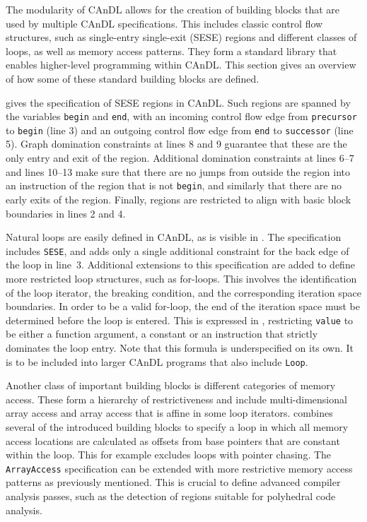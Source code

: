     The modularity of CAnDL allows for the creation of building blocks that are
    used by multiple CAnDL specifications.
    This includes classic control flow structures, such as single-entry
    single-exit (SESE) regions and different classes of loops, as well as memory
    access patterns.
    They form a standard library that enables higher-level programming
    within CAnDL.
    This section gives an overview of how some of these standard building
    blocks are defined.

     gives the specification of SESE regions in CAnDL.
    Such regions are spanned by the variables {\tt begin} and {\tt end}, with an
    incoming control flow edge from {\tt precursor} to {\tt begin} (line 3) and
    an outgoing control flow edge from {\tt end} to {\tt successor} (line 5).
    Graph domination constraints at lines 8 and 9 guarantee that these are the
    only entry and exit of the region.
    Additional domination constraints at lines 6--7 and lines 10--13 make sure
    that there are no jumps from outside the region into an instruction of the
    region that is not {\tt begin}, and similarly that there are no early exits
    of the region.
    Finally, regions are restricted to align with basic block boundaries in
    lines 2 and 4.

    Natural loops are easily defined in CAnDL, as is visible in
    .
    The specification includes {\tt SESE}, and adds only a single additional
    constraint for the back edge of the loop in line~3.
    Additional extensions to this specification are added to define more
    restricted loop structures, such as for-loops.
    This involves the identification of the loop iterator, the breaking
    condition, and the corresponding iteration space boundaries.
    In order to be a valid for-loop, the end of the iteration space must be
    determined before the loop is entered.
    This is expressed in , restricting {\tt value} to be
    either a function argument, a constant or an instruction that strictly
    dominates the loop entry.
    Note that this formula is underspecified on its own.
    It is to be included into larger CAnDL programs that also include
    {\tt Loop}.

    Another class of important building blocks is different categories of
    memory access.
    These form a hierarchy of restrictiveness and include multi-dimensional
    array access and array access that is affine in some loop iterators.
     combines several of the introduced building blocks to
    specify a loop in which all memory access locations are calculated as
    offsets from base pointers that are constant within the loop.
    This for example excludes loops with pointer chasing.
    The {\tt ArrayAccess} specification can be extended with more restrictive
    memory access patterns as previously mentioned.
    This is crucial to define advanced compiler analysis passes, such as the
    detection of regions suitable for polyhedral code analysis.

